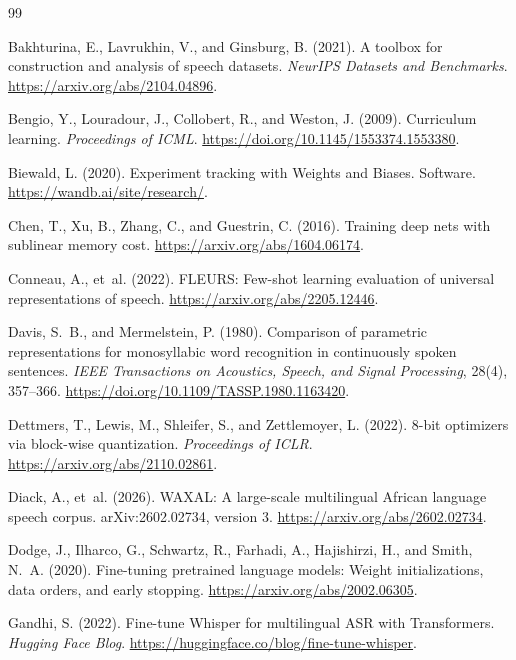 \begin{thebibliography}{99}

Bakhturina, E., Lavrukhin, V., and Ginsburg, B. (2021).
A toolbox for construction and analysis of speech datasets.
\emph{NeurIPS Datasets and Benchmarks}.
\url{https://arxiv.org/abs/2104.04896}.

Bengio, Y., Louradour, J., Collobert, R., and Weston, J. (2009).
Curriculum learning. \emph{Proceedings of ICML}.
\url{https://doi.org/10.1145/1553374.1553380}.

Biewald, L. (2020). Experiment tracking with Weights and Biases.
Software. \url{https://wandb.ai/site/research/}.

Chen, T., Xu, B., Zhang, C., and Guestrin, C. (2016).
Training deep nets with sublinear memory cost.
\url{https://arxiv.org/abs/1604.06174}.

Conneau, A., et~al. (2022). FLEURS: Few-shot learning evaluation of universal
representations of speech. \url{https://arxiv.org/abs/2205.12446}.

Davis, S.~B., and Mermelstein, P. (1980).
Comparison of parametric representations for monosyllabic word recognition
in continuously spoken sentences. \emph{IEEE Transactions on Acoustics,
Speech, and Signal Processing}, 28(4), 357--366.
\url{https://doi.org/10.1109/TASSP.1980.1163420}.

Dettmers, T., Lewis, M., Shleifer, S., and Zettlemoyer, L. (2022).
8-bit optimizers via block-wise quantization. \emph{Proceedings of ICLR}.
\url{https://arxiv.org/abs/2110.02861}.

Diack, A., et~al. (2026). WAXAL: A large-scale multilingual African language
speech corpus. arXiv:2602.02734, version 3.
\url{https://arxiv.org/abs/2602.02734}.

Dodge, J., Ilharco, G., Schwartz, R., Farhadi, A., Hajishirzi, H., and
Smith, N.~A. (2020). Fine-tuning pretrained language models: Weight
initializations, data orders, and early stopping.
\url{https://arxiv.org/abs/2002.06305}.

Gandhi, S. (2022). Fine-tune Whisper for multilingual ASR with Transformers.
\emph{Hugging Face Blog}.
\url{https://huggingface.co/blog/fine-tune-whisper}.


\end{thebibliography}
